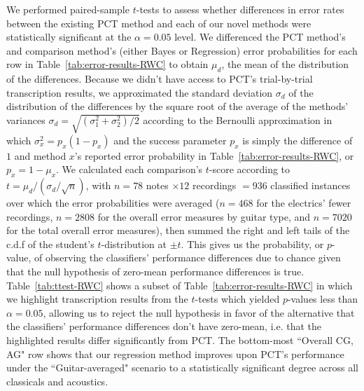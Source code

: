 \documentclass[12pt]{cmuthesis}
\begin{document}
We performed paired-sample $t$-tests to assess whether differences in error rates between the existing PCT method and each of our novel methods were statistically significant at the $\alpha = 0.05$ level. We differenced the PCT method's and comparison method's (either Bayes or Regression) error probabilities for each row in Table~\ref{tab:error-results-RWC} to obtain $\mu_d$, the mean of the distribution of the differences. Because we didn't have access to PCT's trial-by-trial transcription results, we approximated the standard deviation $\sigma_d$ of the distribution of the differences by the square root of the average of the methods' variances $\sigma_d = \sqrt{(\sigma^2_1+\sigma^2_2)/2}$ according to the Bernoulli approximation in which $\sigma_x^2 = p_x(1-p_x)$ and the success parameter $p_x$ is simply the difference of $1$ and method $x$'s reported error probability in Table~\ref{tab:error-results-RWC}, or $p_x = 1-\mu_x$. We calculated each comparison's $t$-score according to $t = \mu_d/(\sigma_d/\sqrt{n})$, with $n= 78$ notes $\times 12$ recordings $=936$ classified instances over which the error probabilities were averaged ($n=468$ for the electrics' fewer recordings, $n=2808$ for the overall error measures by guitar type, and $n=7020$ for the total overall error measures), then summed the right and left tails of the c.d.f of the student's $t$-distribution at $\pm t$. This gives us the probability, or $p$-value, of observing the classifiers' performance differences due to chance given that the null hypothesis of zero-mean performance differences is true. Table~\ref{tab:ttest-RWC} shows a subset of Table~\ref{tab:error-results-RWC} in which we highlight transcription results from the $t$-tests which yielded $p$-values less than $\alpha = 0.05$, allowing us to reject the null hypothesis in favor of the alternative that the classifiers' performance differences don't have zero-mean, i.e. that the highlighted results differ significantly from PCT. The bottom-most ``Overall CG, AG" row shows that our regression method improves upon PCT's performance under the ``Guitar-averaged" scenario to a statistically significant degree across all classicals and acoustics.
\end{document}
